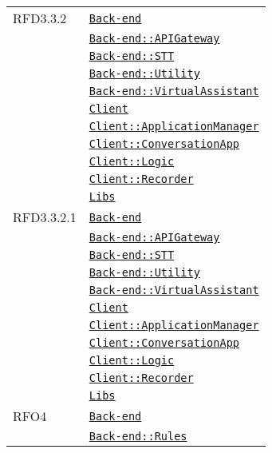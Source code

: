 \begin{longtable}{|>{\centering}m{3cm}|m{10cm}<{\centering}|}
RFD3.3.2 & \hyperref[Back-end]{\texttt{Back-end}}\\
& \hyperref[Back-end::APIGateway]{\texttt{Back-end::APIGateway}}\\
& \hyperref[Back-end::STT]{\texttt{Back-end::STT}}\\
& \hyperref[Back-end::Utility]{\texttt{Back-end::Utility}}\\
& \hyperref[Back-end::VirtualAssistant]{\texttt{Back-end::VirtualAssistant}}\\
& \hyperref[Client]{\texttt{Client}}\\
& \hyperref[Client::ApplicationManager]{\texttt{Client::ApplicationManager}}\\
& \hyperref[Client::ConversationApp]{\texttt{Client::ConversationApp}}\\
& \hyperref[Client::Logic]{\texttt{Client::Logic}}\\
& \hyperref[Client::Recorder]{\texttt{Client::Recorder}}\\
& \hyperref[Libs]{\texttt{Libs}}\\ \hline

RFD3.3.2.1 & \hyperref[Back-end]{\texttt{Back-end}}\\
& \hyperref[Back-end::APIGateway]{\texttt{Back-end::APIGateway}}\\
& \hyperref[Back-end::STT]{\texttt{Back-end::STT}}\\
& \hyperref[Back-end::Utility]{\texttt{Back-end::Utility}}\\
& \hyperref[Back-end::VirtualAssistant]{\texttt{Back-end::VirtualAssistant}}\\
& \hyperref[Client]{\texttt{Client}}\\
& \hyperref[Client::ApplicationManager]{\texttt{Client::ApplicationManager}}\\
& \hyperref[Client::ConversationApp]{\texttt{Client::ConversationApp}}\\
& \hyperref[Client::Logic]{\texttt{Client::Logic}}\\
& \hyperref[Client::Recorder]{\texttt{Client::Recorder}}\\
& \hyperref[Libs]{\texttt{Libs}}\\ \hline

RFO4 & \hyperref[Back-end]{\texttt{Back-end}}\\
& \hyperref[Back-end::Rules]{\texttt{Back-end::Rules}}\\ \hline


\end{longtable}

